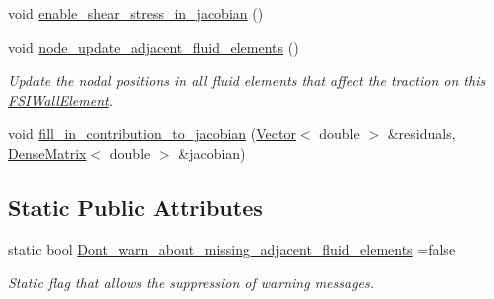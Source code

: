 \begin{DoxyCompactItemize}
void \hyperlink{classoomph_1_1FSIWallElement_a84dc551f32dcecb5166c8b0c51727b77}{enable\+\_\+shear\+\_\+stress\+\_\+in\+\_\+jacobian} ()
\item 
void \hyperlink{classoomph_1_1FSIWallElement_aec47fc9fff885241c68533df8125e0a0}{node\+\_\+update\+\_\+adjacent\+\_\+fluid\+\_\+elements} ()
\begin{DoxyCompactList}\small\item\em Update the nodal positions in all fluid elements that affect the traction on this \hyperlink{classoomph_1_1FSIWallElement}{F\+S\+I\+Wall\+Element}. \end{DoxyCompactList}\item 
void \hyperlink{classoomph_1_1FSIWallElement_a7817d2662c24540d3757cb1a1194a635}{fill\+\_\+in\+\_\+contribution\+\_\+to\+\_\+jacobian} (\hyperlink{classoomph_1_1Vector}{Vector}$<$ double $>$ \&residuals, \hyperlink{classoomph_1_1DenseMatrix}{Dense\+Matrix}$<$ double $>$ \&jacobian)
\end{DoxyCompactItemize}
\subsection*{Static Public Attributes}
\begin{DoxyCompactItemize}
\item 
static bool \hyperlink{classoomph_1_1FSIWallElement_ae7bc07beb09c423ac625a1419644519b}{Dont\+\_\+warn\+\_\+about\+\_\+missing\+\_\+adjacent\+\_\+fluid\+\_\+elements} =false
\begin{DoxyCompactList}\small\item\em Static flag that allows the suppression of warning messages. \end{DoxyCompactList}\end{DoxyCompactItemize}
